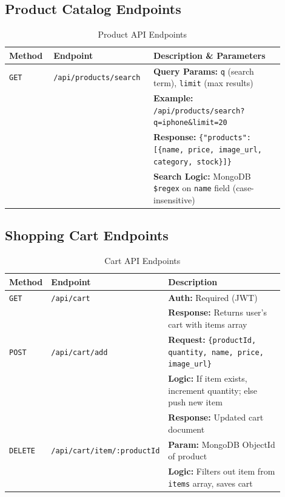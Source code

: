 \subsection{Product Catalog Endpoints}

\begin{table}[H]
\centering
\caption{Product API Endpoints}
\label{tab:api_products}
\small
\begin{tabular}{@{}p{0.15\linewidth}p{0.30\linewidth}p{0.45\linewidth}@{}}
\toprule
\textbf{Method} & \textbf{Endpoint} & \textbf{Description \& Parameters} \\
\midrule
\texttt{GET} & \texttt{/api/products/search} & 
\textbf{Query Params:} \texttt{q} (search term), \texttt{limit} (max results) \\
& & \textbf{Example:} \texttt{/api/products/search?q=iphone\&limit=20} \\
& & \textbf{Response:} \texttt{\{"products": [\{name, price, image\_url, category, stock\}]\}} \\
& & \textbf{Search Logic:} MongoDB \texttt{\$regex} on \texttt{name} field (case-insensitive) \\
\bottomrule
\end{tabular}
\end{table}

\subsection{Shopping Cart Endpoints}

\begin{table}[H]
\centering
\caption{Cart API Endpoints}
\label{tab:api_cart}
\small
\begin{tabular}{@{}p{0.15\linewidth}p{0.30\linewidth}p{0.45\linewidth}@{}}
\toprule
\textbf{Method} & \textbf{Endpoint} & \textbf{Description} \\
\midrule
\texttt{GET} & \texttt{/api/cart} & 
\textbf{Auth:} Required (JWT) \\
& & \textbf{Response:} Returns user's cart with items array \\
\midrule
\texttt{POST} & \texttt{/api/cart/add} & 
\textbf{Request:} \texttt{\{productId, quantity, name, price, image\_url\}} \\
& & \textbf{Logic:} If item exists, increment quantity; else push new item \\
& & \textbf{Response:} Updated cart document \\
\midrule
\texttt{DELETE} & \texttt{/api/cart/item/:productId} & 
\textbf{Param:} MongoDB ObjectId of product \\
& & \textbf{Logic:} Filters out item from \texttt{items} array, saves cart \\
\bottomrule
\end{tabular}
\end{table}

